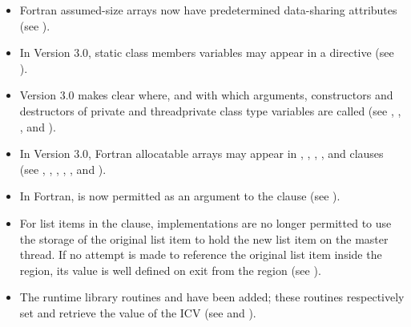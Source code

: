 \begin{itemize}
\item Fortran assumed-size arrays now have predetermined data-sharing attributes 
      (see ).

\item In Version 3.0, static class members variables may appear in a 
       directive (see ).

\item Version 3.0 makes clear where, and with which arguments, constructors and
      destructors of private and threadprivate class type variables are called 
      (see , 
      , ,
       and ).

\item In Version 3.0, Fortran allocatable arrays may appear in ,
      , , ,  
      and  clauses (see ,
      , ,
      , ,
       and ).

\item In Fortran,  is now permitted as an argument to the 
       clause (see ).

\item For list items in the  clause, implementations are no longer 
      permitted to use the storage of the original list item to hold the new list 
      item on the master thread. If no attempt is made to reference the original 
      list item inside the  region, its value is well defined on 
      exit from the  region (see ).

\item The runtime library routines  and 
       have been added; these routines respectively set 
      and retrieve the value of the  ICV 
      (see  and ).


\end{itemize}

